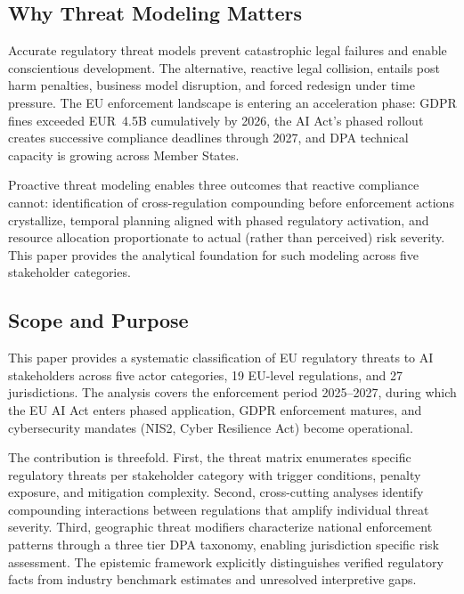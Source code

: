 \documentclass[11pt,a4paper]{article}
\begin{document}
\subsection{Why Threat Modeling Matters}

Accurate regulatory threat models prevent catastrophic legal failures and enable conscientious development. The alternative, reactive legal collision, entails post harm penalties, business model disruption, and forced redesign under time pressure. The EU enforcement landscape is entering an acceleration phase: GDPR fines exceeded EUR~4.5B cumulatively by 2026, the AI Act's phased rollout creates successive compliance deadlines through 2027, and DPA technical capacity is growing across Member States.

Proactive threat modeling enables three outcomes that reactive compliance cannot: identification of cross-regulation compounding before enforcement actions crystallize, temporal planning aligned with phased regulatory activation, and resource allocation proportionate to actual (rather than perceived) risk severity. This paper provides the analytical foundation for such modeling across five stakeholder categories.

\subsection{Scope and Purpose}

This paper provides a systematic classification of EU regulatory threats to AI stakeholders across five actor categories, 19 EU-level regulations, and 27 jurisdictions. The analysis covers the enforcement period 2025--2027, during which the EU AI Act enters phased application, GDPR enforcement matures, and cybersecurity mandates (NIS2, Cyber Resilience Act) become operational.

The contribution is threefold. First, the threat matrix enumerates specific regulatory threats per stakeholder category with trigger conditions, penalty exposure, and mitigation complexity. Second, cross-cutting analyses identify compounding interactions between regulations that amplify individual threat severity. Third, geographic threat modifiers characterize national enforcement patterns through a three tier DPA taxonomy, enabling jurisdiction specific risk assessment. The epistemic framework explicitly distinguishes verified regulatory facts from industry benchmark estimates and unresolved interpretive gaps.


\end{document}
